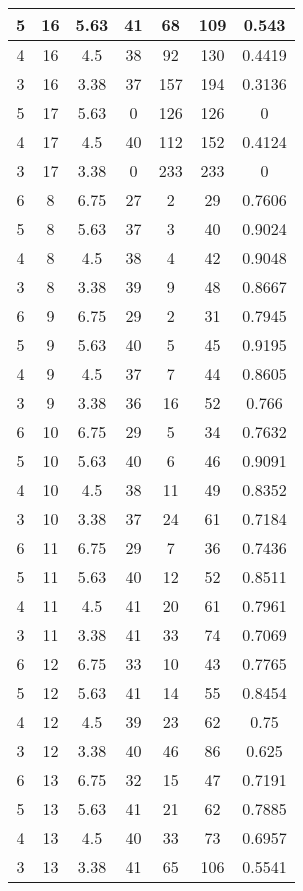 \documentclass[letterpaper, 12pt]{article}
\begin{document}
\begin{longtable}{|c|c|c|c|c|c|c|}
\hline
5 & 16 & 5.63 & 41 & 68 & 109 & 0.543 \\
\hline
4 & 16 & 4.5 & 38 & 92 & 130 & 0.4419 \\
\hline
3 & 16 & 3.38 & 37 & 157 & 194 & 0.3136 \\
\hline
5 & 17 & 5.63 & 0 & 126 & 126 & 0 \\
\hline
4 & 17 & 4.5 & 40 & 112 & 152 & 0.4124 \\
\hline
3 & 17 & 3.38 & 0 & 233 & 233 & 0 \\
\hline
6 & 8 & 6.75 & 27 & 2 & 29 & 0.7606 \\
\hline
5 & 8 & 5.63 & 37 & 3 & 40 & 0.9024 \\
\hline
4 & 8 & 4.5 & 38 & 4 & 42 & 0.9048 \\
\hline
3 & 8 & 3.38 & 39 & 9 & 48 & 0.8667 \\
\hline
6 & 9 & 6.75 & 29 & 2 & 31 & 0.7945 \\
\hline
5 & 9 & 5.63 & 40 & 5 & 45 & 0.9195 \\
\hline
4 & 9 & 4.5 & 37 & 7 & 44 & 0.8605 \\
\hline
3 & 9 & 3.38 & 36 & 16 & 52 & 0.766 \\
\hline
6 & 10 & 6.75 & 29 & 5 & 34 & 0.7632 \\
\hline
5 & 10 & 5.63 & 40 & 6 & 46 & 0.9091 \\
\hline
4 & 10 & 4.5 & 38 & 11 & 49 & 0.8352 \\
\hline
3 & 10 & 3.38 & 37 & 24 & 61 & 0.7184 \\
\hline
6 & 11 & 6.75 & 29 & 7 & 36 & 0.7436 \\
\hline
5 & 11 & 5.63 & 40 & 12 & 52 & 0.8511 \\
\hline
4 & 11 & 4.5 & 41 & 20 & 61 & 0.7961 \\
\hline
3 & 11 & 3.38 & 41 & 33 & 74 & 0.7069 \\
\hline
6 & 12 & 6.75 & 33 & 10 & 43 & 0.7765 \\
\hline
5 & 12 & 5.63 & 41 & 14 & 55 & 0.8454 \\
\hline
4 & 12 & 4.5 & 39 & 23 & 62 & 0.75 \\
\hline
3 & 12 & 3.38 & 40 & 46 & 86 & 0.625 \\
\hline
6 & 13 & 6.75 & 32 & 15 & 47 & 0.7191 \\
\hline
5 & 13 & 5.63 & 41 & 21 & 62 & 0.7885 \\
\hline
4 & 13 & 4.5 & 40 & 33 & 73 & 0.6957 \\
\hline
3 & 13 & 3.38 & 41 & 65 & 106 & 0.5541 \\

\end{longtable}
\end{document}
